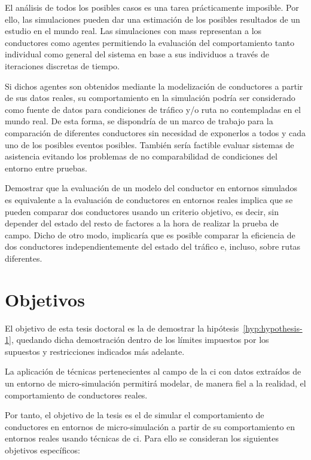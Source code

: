 El análisis de todos los posibles casos es una tarea prácticamente imposible. Por ello, las simulaciones pueden dar una estimación de los posibles resultados de un estudio en el mundo real. Las simulaciones con \acp{mas} representan a los conductores como agentes permitiendo la evaluación del comportamiento tanto individual como general del sistema en base a sus individuos a través de iteraciones discretas de tiempo.

Si dichos agentes son obtenidos mediante la modelización de conductores a partir de sus datos reales, su comportamiento en la simulación podría ser considerado como fuente de datos para condiciones de tráfico y/o ruta no contempladas en el mundo real. De esta forma, se dispondría de un marco de trabajo para la comparación de diferentes conductores sin necesidad de exponerlos a todos y cada uno de los posibles eventos posibles. También sería factible evaluar sistemas de asistencia evitando los problemas de no comparabilidad de condiciones del entorno entre pruebas.

Demostrar que la evaluación de un modelo del conductor en entornos simulados es equivalente a la evaluación de conductores en entornos reales implica que se pueden comparar dos conductores usando un criterio objetivo, es decir, sin depender del estado del resto de factores a la hora de realizar la prueba de campo. Dicho de otro modo, implicaría que es posible comparar la eficiencia de dos conductores independientemente del estado del tráfico e, incluso, sobre rutas diferentes.

\section{Objetivos}
\label{ch:intro:objectives}

El objetivo de esta tesis doctoral es la de demostrar la hipótesis~\ref{hyp:hypothesis-1}, quedando dicha demostración dentro de los límites impuestos por los supuestos y restricciones indicados más adelante.

\begin{hyp} \label{hyp:hypothesis-1}
	La aplicación de técnicas pertenecientes al campo de la \ac{ci} con datos extraídos de un entorno de micro-simulación permitirá modelar, de manera fiel a la realidad, el comportamiento de conductores reales.
\end{hyp}

Por tanto, el objetivo de la tesis es el de simular el comportamiento de conductores en entornos de micro-simulación a partir de su comportamiento en entornos reales usando técnicas de \ac{ci}. Para ello se consideran los siguientes objetivos específicos:

